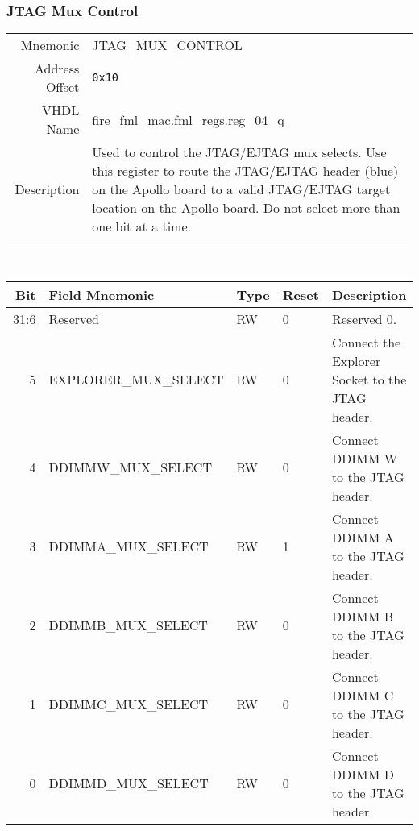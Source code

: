 \subsubsection{JTAG Mux Control}
\begin{tabular}{ r | p{350px} }
  Mnemonic       & JTAG\_MUX\_CONTROL                  \\
  Address Offset & \texttt{0x10}                       \\
  VHDL Name      & fire\_fml\_mac.fml\_regs.reg\_04\_q \\ \hline

  Description &
  Used to control the JTAG/EJTAG mux selects. Use this register to
  route the JTAG/EJTAG header (blue) on the Apollo board to a valid
  JTAG/EJTAG target location on the Apollo board. Do not select more
  than one bit at a time. \\
\end{tabular}
\\
\begin{tabularx}{\textwidth}{r|l|l|l|X}
  \hline
  Bit   & Field Mnemonic                   & Type & Reset & Description \\ \hline

  31:6  & Reserved                         & RW   & 0     &

  Reserved 0. \\

  5     & EXPLORER\_MUX\_SELECT            & RW   & 0     &

  Connect the Explorer Socket to the JTAG header. \\

  4     & DDIMMW\_MUX\_SELECT              & RW   & 0     &

  Connect DDIMM W to the JTAG header. \\

  3     & DDIMMA\_MUX\_SELECT              & RW   & 1     &

  Connect DDIMM A to the JTAG header. \\

  2     & DDIMMB\_MUX\_SELECT              & RW   & 0     &

  Connect DDIMM B to the JTAG header. \\

  1     & DDIMMC\_MUX\_SELECT              & RW   & 0     &

  Connect DDIMM C to the JTAG header. \\

  0     & DDIMMD\_MUX\_SELECT              & RW   & 0     &

  Connect DDIMM D to the JTAG header. \\
\end{tabularx}

